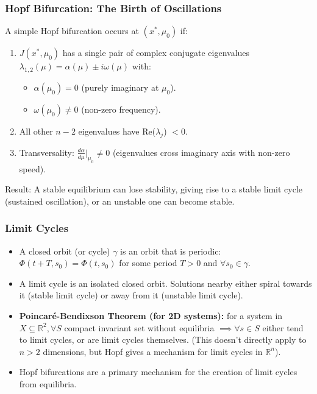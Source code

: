 \documentclass[aspectratio=169]{beamer}
\begin{document}
\begin{frame}{\insertsectionhead}
	\frametitle{Hopf Bifurcation: The Birth of Oscillations}
	A simple Hopf bifurcation occurs at $(x^*, \mu_0)$ if:
	\begin{enumerate}
		\item $J(x^*, \mu_0)$ has a \alert{single pair of complex conjugate eigenvalues} $\lambda_{1,2}(\mu) = \alpha(\mu) \pm i\omega(\mu)$ with:
			\begin{itemize}
				\item $\alpha(\mu_0) = 0$ (purely imaginary at $\mu_0$).
				\item $\omega(\mu_0) \neq 0$ (non-zero frequency).
			\end{itemize}
		\item All other $n-2$ eigenvalues have Re($\lambda_j$) $< 0$.
		\item \alert{Transversality}: $\frac{d\alpha}{d\mu}\bigg|_{\mu_0} \neq 0$ (eigenvalues cross imaginary axis with non-zero speed).
	\end{enumerate}
	\alert{Result}: A stable equilibrium can lose stability, giving rise to a stable \alert{limit cycle} (sustained oscillation), or an unstable one can become stable.
\end{frame}

\begin{frame}{\insertsectionhead}
	\frametitle{Limit Cycles}
	\begin{itemize}
		\item A \alert{closed orbit (or cycle)} $\gamma$ is an orbit that is periodic: $\Phi(t+T, s_0) = \Phi(t, s_0)$ for some period $T>0$ and $\forall s_0 \in \gamma$.
		\item A \alert{limit cycle} is an isolated closed orbit. Solutions nearby either spiral towards it (stable limit cycle) or away from it (unstable limit cycle).
		\item \textbf{Poincaré-Bendixson Theorem (for 2D systems):} for a system in $X \subseteq \mathbb{R}^2, \forall S$ compact invariant set without equilibria $\implies \forall s \in S$ either tend to limit cycles, or are limit cycles themselves. (This doesn't directly apply to $n>2$ dimensions, but Hopf gives a mechanism for limit cycles in $\mathbb{R}^n$).
		\item Hopf bifurcations are a primary mechanism for the creation of limit cycles from equilibria.
	\end{itemize}
\end{frame}
\end{document}
